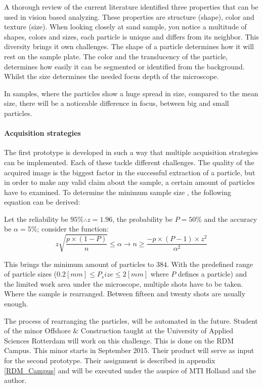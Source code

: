 A thorough review of the current literature \cite{Spijker14a} identified three properties that can be used in vision based analyzing. These properties are structure  (shape), color and texture  (size). When looking closely at sand sample, you notice a multitude of shapes, colors and sizes, each particle is unique and differs from its neighbor. This diversity brings it own challenges. The shape of a particle determines how it will rest on the sample plate. The color and the translucency of the particle, determines how easily it can be segmented or identified from the background. Whilst the size determines the needed focus depth of the microscope. 
\begin{remark}
	In samples, where the particles show a huge spread in size, compared to the mean size, there will be a noticeable difference in focus, between big and small particles. 
\end{remark}

\paragraph{Acquisition strategies}The first prototype is developed in such a way that multiple acquisition strategies can be implemented. Each of these tackle different challenges. The quality of the acquired image is the biggest factor in the successful extraction of a particle, but in order to make any valid claim about the sample, a certain amount of particles have to examined. To determine the minimum sample size , the following equation can be derived:
\begin{sBox}
	Let the reliability be $95\% \therefore z=1.96$, the probability be $P=50\%$ and the accuracy be $\alpha=5\%$; consider the function:
	\begin{equation}
		z\sqrt{\frac{p\times(1-P)}{n}}\leq\alpha \rightarrow n\geq\frac{-p\times(P-1)\times z^2}{\alpha^2}
	\end{equation}
\end{sBox}
This brings the minimum amount of particles to $384$. With the predefined range of particle sizes ($0.2[mm]\leq P_size \leq 2[mm]$ where $P$ defines a particle) and the limited work area under the microscope, multiple shots have to be taken. Where the sample is rearranged. Between fifteen and twenty shots are usually enough.
\begin{remark}
	The process of rearranging the particles, will be automated in the future. Student of the minor Offshore \& Construction taught at the University of Applied Sciences Rotterdam will work on this challenge. This is done on the RDM Campus. This minor starts in September 2015. Their product will serve as input for the second prototype. Their assignment is described in appendix \ref{RDM_Campus} and will be executed under the auspice of MTI Holland and the author.
\end{remark}

